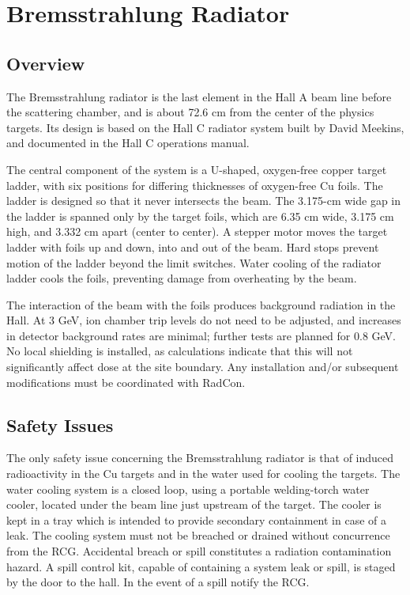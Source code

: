 \section{Bremsstrahlung Radiator}

\subsection{Overview}

The Bremsstrahlung radiator is the last element in the Hall A beam line 
before the scattering chamber, and is about 72.6 cm from the center 
of the physics targets.
Its design is based on the Hall C radiator 
system built by David Meekins, and documented in the Hall C operations
manual.

The central component of the system is a U-shaped, oxygen-free copper target
ladder, with six positions for differing thicknesses of oxygen-free Cu foils.
The ladder is designed so that it never intersects the beam.
The 3.175-cm wide gap in the ladder is spanned only by 
the target foils, which are 6.35 cm wide, 3.175 cm high,
and 3.332 cm apart (center to center).
A stepper motor moves the target ladder with foils up and down,
into and out of the beam.
Hard stops prevent motion of the ladder beyond the limit switches.
Water cooling of the radiator ladder cools the foils, preventing
damage from overheating by the beam.

The interaction of the beam with the foils produces
background radiation in the Hall.
At 3 GeV, ion chamber trip levels do not need to be
adjusted, and increases in detector background rates are minimal;
further tests are planned for 0.8 GeV.
No local shielding is installed, as calculations indicate
that this will not significantly affect dose at the site boundary.
Any installation and/or subsequent modifications must be coordinated
with RadCon.

\subsection{Safety Issues}

The only safety issue concerning the Bremsstrahlung radiator is that of
induced radioactivity in the Cu targets and in the water 
used for cooling the targets.
The water cooling system is a closed loop,
using a portable welding-torch water cooler, located
under the beam line just upstream of the target. 
The cooler is kept in a tray which is intended to provide secondary
containment in case of a leak.
The cooling system must not be breached or drained without concurrence from 
the RCG. Accidental breach or spill constitutes a radiation contamination hazard.  
A spill control kit, capable of containing a system leak or spill, is
staged by the door to the hall. In the event of a spill notify
the RCG.


